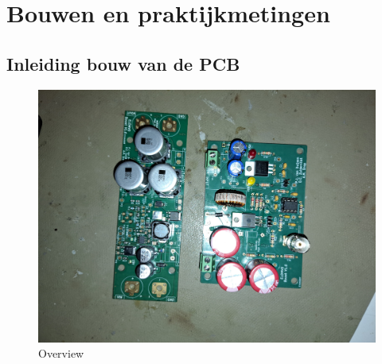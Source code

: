\section{Bouwen en praktijkmetingen}
\subsection{Inleiding bouw van de PCB}
\begin{figure}[!h]
    \centering
    \includegraphics[width=0.5\linewidth]{img//hfd5/WhatsApp Image 2024-10-27 at 23.40.52_4fb77a8e.jpg}
    \caption{Overview}
    \label{fig:piemels}
\end{figure}